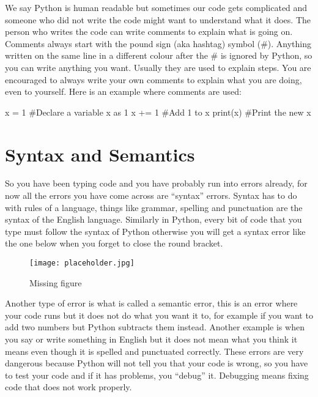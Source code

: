 We say Python is human readable but sometimes our code gets complicated and someone who did not write the code might want to understand what it does. The person who writes the code can write comments to explain what is going on. Comments always start with the pound sign (aka hashtag) symbol (\#). Anything written on the same line in a different colour after the \# is ignored by Python, so you can write anything you want. Usually they are used to explain steps. You are encouraged to
always write your own comments to explain what you are doing, even to yourself. Here is an example where comments are used:

\begin{script}
x = 1         #Declare a variable x as 1
x += 1        #Add 1 to x
print(x)      #Print the new x
\end{script}

\section{Syntax and Semantics}

So you have been typing code and you have probably run into errors already, for now all the errors you have come across are “syntax” errors. Syntax has to do with rules of a language, things like grammar, spelling and punctuation are the syntax of the English language. Similarly in Python, every bit of code that you type must follow the syntax of Python otherwise you will get a syntax error like the one below when you forget to close the round bracket.

\begin{figure}[h]
\centering\texttt{[image: placeholder.jpg]}
\caption{Missing figure}
\label{fig:placeholder} %
\end{figure}

Another type of error is what is called a semantic error, this is an error where your code runs but it does not do what you want it to, for example if you want to add two numbers but Python subtracts them instead. Another example is when you say or write something in English but it does not mean what you think it means even though it is spelled and punctuated correctly. These errors are very dangerous because Python will not tell you that your code is wrong, so you have to test your code and if it has problems, you “debug” it. Debugging means fixing code that does not work properly.

